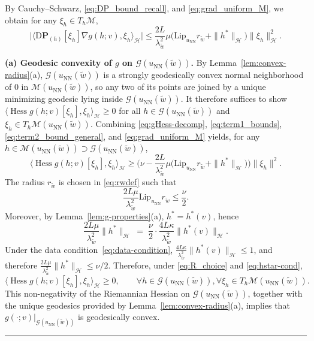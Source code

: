 \documentclass[twoside,11pt]{article}
\newcommand{\BlackBoxProof}{\rule{1.5ex}{1.5ex}}
\renewenvironment{proof}{\par\noindent{\bf Proof\ }}{\hfill\BlackBoxProof\par\medskip}
\renewcommand{\P}{\mathbf{P}}
\newcommand{\D}{\mathrm{D}}
\newcommand{\Hess}{\operatorname{Hess} }
\newcommand{\NN}{\mathrm{NN}}
\newcommand{\Lip}{\mathrm{Lip}}
\newcommand{\calG}{\mathcal{G}}
\newcommand{\calH}{\mathcal{H}}
\newcommand{\calM}{\mathcal{M}}
\begin{document}
\begin{proof}
By Cauchy--Schwarz, \eqref{eq:DP_bound_recall}, and \eqref{eq:grad_uniform_M}, we obtain for any $\xi_h\in T_h\mathcal M$,
\begin{equation}\label{eq:term2_bound_general}
\big|\langle\D \P_{(h)}[\xi_h] \nabla g(h;v) , \xi_h \rangle_{\mathcal H}\big|
\le \frac{2L}{\lambda_{\tilde w}^2} \mu\big( \Lip_{u_\NN}  r_{\tilde w} +\|h^*\|_{\mathcal H}\big)\|\xi_h\|_{\mathcal H}^2.
\end{equation}

\medskip
\noindent\textbf{(a) Geodesic convexity of $g$ on $\calG(u_\NN(\tilde w))$.}
By Lemma~\ref{lem:convex-radius}(a), $\calG(u_\NN(\tilde w))$ is a strongly geodesically convex normal neighborhood of $0$ in $\calM(u_\NN(\tilde w))$, so any two of its points are joined by a unique minimizing geodesic lying inside $\calG(u_\NN(\tilde w))$. It therefore suffices to show $\langle \Hess g(h;v)[\xi_h], \xi_h\rangle_\calH \ge 0$ for all $h \in \calG(u_\NN(\tilde w))$ and $\xi_h \in T_h\calM(u_\NN(\tilde w))$. Combining \eqref{eq:gHess-decomp}, \eqref{eq:term1_bounds},
\eqref{eq:term2_bound_general}, and \eqref{eq:grad_uniform_M} yields, for any $h \in \calM(u_\NN(\tilde w)) \supset \calG(u_\NN(\tilde w))$,
\[
\langle \Hess g(h;v)[\xi_h],\xi_h\rangle_{\mathcal H}
\ge \Big(\nu-\frac{2L}{\lambda_{\tilde w}^2}\mu\big( \Lip_{u_\NN}  r_{\tilde w} +\|h^*\|_{\mathcal H}\big)\Big)\|\xi_h\|^2.
\]
The radius $r_{\tilde w}$ is chosen in \eqref{eq:rwdef} such that
\begin{equation}\label{eq:R_choice}
\frac{2L\mu}{\lambda_{\tilde w}^2} \Lip _{u_\NN} r _{\tilde w}  \le  \frac{\nu}{2}.
\end{equation}
Moreover, by Lemma~\ref{lem:g-properties}(a), $h^*=h^*(v)$, hence
\begin{equation}\label{eq:hstar-cond}
\frac{2L\mu}{\lambda_{\tilde w}^{2}}\|h^*\|_\calH
\;=\; \frac{\nu}{2}\cdot\frac{4L\kappa}{\lambda_{\tilde w}^{2}}\|h^*(v)\|_\calH .
\end{equation}
Under the data condition~\eqref{eq:data-condition}, $\frac{4L\kappa}{\lambda_{\tilde w}^{2}}\|h^*(v)\|_\calH\le 1$, and therefore $\frac{2L\mu}{\lambda_{\tilde w}^{2}}\|h^*\|_\calH\le \nu/2$.
Therefore, under \eqref{eq:R_choice} and \eqref{eq:hstar-cond},
\[
\langle \Hess g(h;v)[\xi_h],\xi_h\rangle_{\mathcal H}\ge 0,
\qquad \forall h\in\calG(u_\NN(\tilde w)),  \forall \xi_h\in T_h\mathcal M(u_\NN(\tilde w)).
\]
This non-negativity of the Riemannian Hessian on $\calG(u_\NN(\tilde w))$, together with the unique geodesics provided by Lemma~\ref{lem:convex-radius}(a), implies that $g(\cdot;v)|_{\calG(u_\NN(\tilde w))}$ is geodesically convex.


\end{proof}
\end{document}
